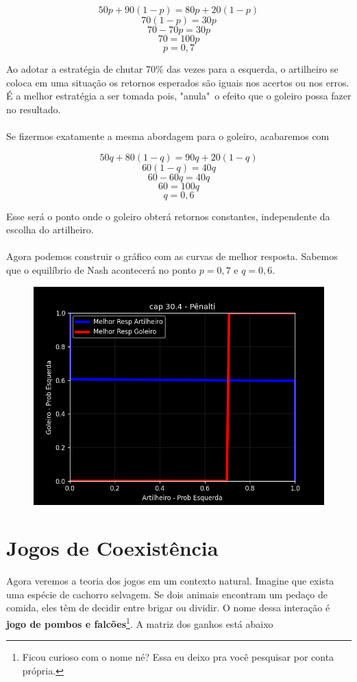 \documentclass[a4paper,11pt,oneside]{book}
\theoremstyle{definition}
\theoremstyle{break}
\begin{document}
$$50p + 90(1-p) = 80p + 20(1-p)$$
$$70(1-p) = 30p$$
$$70 - 70p = 30p$$
$$70 = 100p$$
$$p = 0,7$$

Ao adotar a estratégia de chutar 70\% das vezes para a esquerda, o artilheiro se coloca em uma situação os retornos esperados são iguais nos acertos ou nos erros. É a melhor estratégia a ser tomada pois, "anula"\ o efeito que o goleiro possa fazer no resultado.
\\
\\
Se fizermos exatamente a mesma abordagem para o goleiro, acabaremos com

$$50q + 80(1-q) = 90q + 20(1-q)$$
$$60(1-q) = 40q$$
$$60 - 60q = 40q$$
$$60 = 100q$$
$$q = 0,6$$

Esse será o ponto onde o goleiro obterá retornos constantes, independente da escolha do artilheiro.
\\
\\
Agora podemos construir o gráfico com as curvas de melhor resposta. Sabemos que o equilíbrio de Nash acontecerá no ponto $p = 0,7$ e $q = 0,6$.

\begin{figure}[H]
\centering
\includegraphics[scale=0.75]{cap30_4-jogos_competitivos.png}
\end{figure}

\section{Jogos de Coexistência}

Agora veremos a teoria dos jogos em um contexto natural. Imagine que exista uma espécie de cachorro selvagem. Se dois animais encontram um pedaço de comida, eles têm de decidir entre brigar ou dividir. O nome dessa interação é \textbf{jogo de pombos e falcões}\footnote{Ficou curioso com o nome né? Essa eu deixo pra você pesquisar por conta própria.}. A matriz dos ganhos está abaixo
\end{document}
